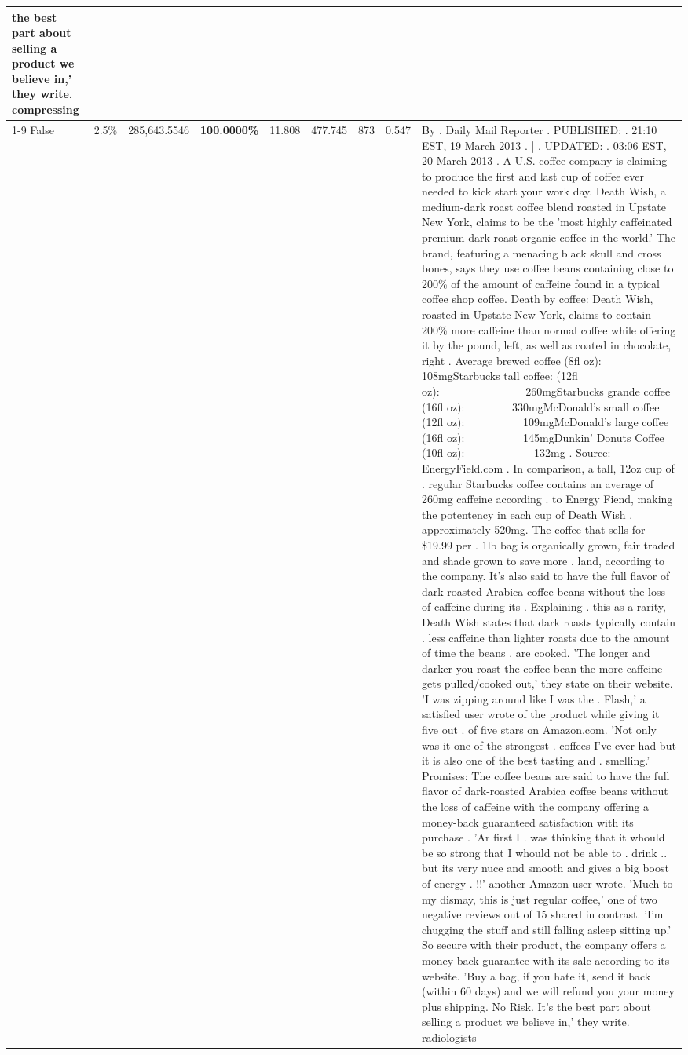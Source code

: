 \begin{table}[H]
{\begin{tabular}{lllrlllll}
the best part about selling a product we believe in,' they write. compressing \\
\cline{1-9}
False & 2.5\% & 285,643.5546 & \bfseries \color{red} 100.0000\% & 11.808 & 477.745 & 873 & 0.547 & By . Daily Mail Reporter . PUBLISHED: . 21:10 EST, 19 March 2013 . | . UPDATED: . 03:06 EST, 20 March 2013 . A U.S. coffee company is claiming to produce the first and last cup of coffee ever needed to kick start your work day. Death Wish, a medium-dark roast coffee blend roasted in Upstate New York, claims to be the 'most highly caffeinated premium dark roast organic coffee in the world.' The brand, featuring a menacing black skull and cross bones, says they use coffee beans containing close to 200\% of the amount of caffeine found in a typical coffee shop coffee. Death by coffee: Death Wish, roasted in Upstate New York, claims to contain 200\% more caffeine than normal coffee while offering it by the pound, left, as well as coated in chocolate, right . Average brewed coffee (8fl oz):              108mgStarbucks tall coffee: (12fl oz):                260mgStarbucks grande coffee (16fl oz):         330mgMcDonald's small coffee (12fl oz):           109mgMcDonald's large coffee (16fl oz):           145mgDunkin' Donuts Coffee (10fl oz):             132mg . Source: EnergyField.com . In comparison, a tall, 12oz cup of . regular Starbucks coffee contains an average of 260mg caffeine according . to Energy Fiend, making the potentency in each cup of Death Wish . approximately 520mg. The coffee that sells for \$19.99 per . 1lb bag is organically grown, fair traded and shade grown to save more . land, according to the company. It's also said to have the full flavor of dark-roasted Arabica coffee beans without the loss of caffeine during its . Explaining . this as a rarity, Death Wish states that dark roasts typically contain . less caffeine than lighter roasts due to the amount of time the beans . are cooked. 'The longer and darker you roast the coffee bean the more caffeine gets pulled/cooked out,' they state on their website. 'I was zipping around like I was the . Flash,' a satisfied user wrote of the product while giving it five out . of five stars on Amazon.com. 'Not only was it one of the strongest . coffees I've ever had but it is also one of the best tasting and . smelling.’ Promises: The coffee beans are said to have the full flavor of dark-roasted Arabica coffee beans without the loss of caffeine with the company offering a money-back guaranteed satisfaction with its purchase . 'Ar first I . was thinking that it whould be so strong that I whould not be able to . drink .. but its very nuce and smooth and gives a big boost of energy . !!' another Amazon user wrote. 'Much to my dismay, this is just regular coffee,' one of two negative reviews out of 15 shared in contrast. 'I'm chugging the stuff and still falling asleep sitting up.' So secure with their product, the company offers a money-back guarantee with its sale according to its website. 'Buy a bag, if you hate it, send it back (within 60 days) and we will refund you your money plus shipping. No Risk. It’s the best part about selling a product we believe in,' they write. radiologists \\

\end{tabular}}
\end{table}
